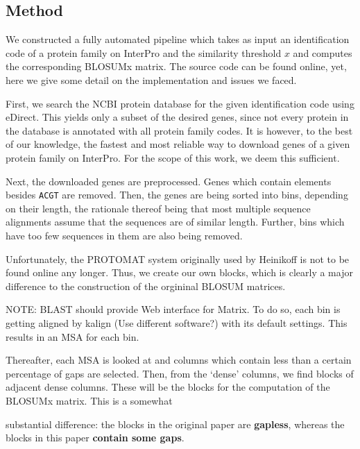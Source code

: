 \documentclass{article}
\begin{document}
\subsection*{Method}
We constructed a fully automated pipeline which takes as input an identification code of a protein
family on InterPro and the similarity threshold $x$ and computes the
corresponding BLOSUMx matrix. The source code can be found online, yet, here we
give some detail on the implementation and issues we faced.

First, we search the NCBI protein database for the given identification code
using eDirect. This yields only a subset of the desired genes, since not every
protein in the database is annotated with all protein family codes. It is
however, to the best of our knowledge, the fastest and most reliable way to
download genes of a given protein family on InterPro. For the scope of this
work, we deem this sufficient.

Next, the downloaded genes are preprocessed. Genes which contain elements
besides \texttt{ACGT} are removed. Then, the genes are being sorted into bins,
depending on their length, the rationale thereof being that most multiple
sequence alignments assume that the sequences are of similar length. Further,
bins which have too few sequences in them are also being removed.

Unfortunately, the PROTOMAT system originally used by Heinikoff is not to be
found online any longer. Thus, we create our own blocks, which is clearly a
major difference to the construction of the orgininal BLOSUM matrices.

NOTE: BLAST should provide Web interface for Matrix.
To do so, each bin is getting aligned by kalign (Use different software?) with
its default settings. This results in an MSA for each bin.

Thereafter, each MSA is looked at and columns which contain less than a certain
percentage of gaps are selected. Then, from the `dense' columns, we find blocks
of adjacent dense columns. These will be the blocks for the computation of the
BLOSUMx matrix. This is a somewhat

substantial difference: the blocks in the original paper are \textbf{gapless},
whereas the blocks in this paper \textbf{contain some gaps}.


\printbibliography
\end{document}
